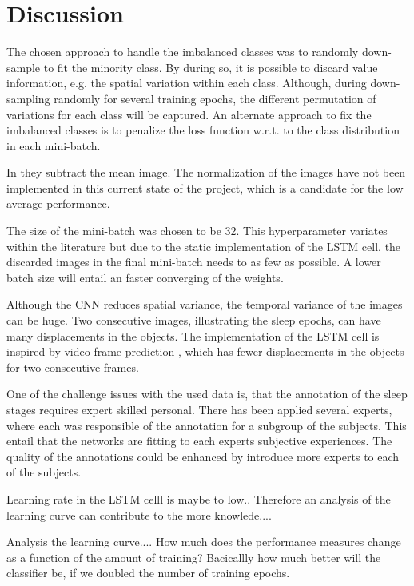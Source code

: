 \section{Discussion}
\label{sec:discussion}

The chosen approach to handle the imbalanced classes was to randomly down-sample to fit the minority class. By during so, it is possible to discard value information, e.g. the spatial variation within each class. Although, during down-sampling randomly for several training epochs, the different permutation of variations for each class will be captured.  
An alternate approach to fix the imbalanced classes is to penalize the loss function w.r.t. to the class distribution in each mini-batch.

In \cite{	main_ar,VGGnet16} they subtract the mean image. The normalization of the images have not been implemented in this current state of the project, which is a candidate for the low average performance.

The size of the mini-batch was chosen to be 32. This hyperparameter variates within the literature but due to the static implementation of the LSTM cell, the discarded images in the final mini-batch needs to as few as possible. A lower batch size will entail an faster converging of the weights. 

Although the CNN reduces spatial variance, the temporal variance of the images can be huge. Two consecutive images, illustrating the sleep epochs, can have many displacements in the objects. The implementation of the LSTM cell is inspired by video frame prediction \cite{git_lstm}, which has fewer displacements in the objects for two consecutive frames. 

One of the challenge issues with the used data is, that the annotation of the sleep stages requires expert skilled personal. There has been applied several experts, where each was responsible of the annotation for a subgroup of the subjects. This entail that the networks are fitting to each experts subjective experiences. The quality of the annotations could be enhanced by introduce more experts to each of the subjects.


Learning rate in the LSTM celll is maybe to low.. Therefore an analysis of the learning curve can contribute to the more knowlede....


Analysis the learning curve.... How much does the performance measures change as a function of the amount of training? Bacicallly how much better will the classifier be, if we doubled the number of training epochs.

